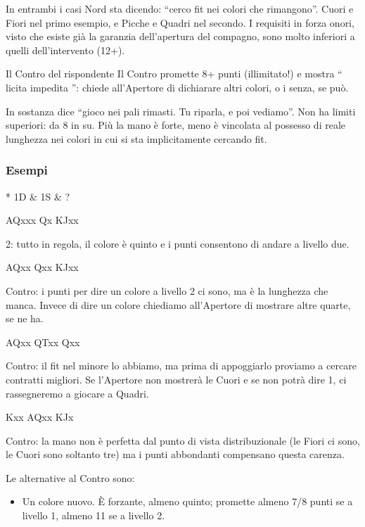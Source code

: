 \documentclass[../corsofiori.tex]{subfiles}
\begin{document}
In entrambi i casi Nord sta dicendo: “cerco fit nei colori che rimangono”.
Cuori e Fiori nel primo esempio, e Picche e Quadri nel secondo. I requisiti in forza
onori, visto che esiste già la garanzia dell’apertura del compagno, sono molto
inferiori a quelli dell’intervento (12+).

\begin{regola}{Il Contro del rispondente}
Il Contro promette 8+ punti (illimitato!)
e mostra “ licita impedita ”: chiede all’Apertore
di dichiarare altri colori, o i senza, se può.
\end{regola}

In sostanza dice “gioco nei pali rimasti. Tu riparla, e poi vediamo”. Non ha limiti
superiori: da 8 in su. Più la mano è forte, meno è vincolata al possesso di reale
lunghezza nei colori in cui si sta implicitamente cercando fit.

\subsubsection{Esempi}
\begin{bidding}*
    1D & 1S & ?\\
\end{bidding}

 {AQxxx}  {Qx}  {KJxx}

2\He: tutto in regola, il colore è quinto e i punti consentono di andare a livello due.
\smallskip

  {AQxx}  {Qxx}  {KJxx}

Contro: i punti per dire un colore a livello 2 ci sono, ma è la lunghezza che manca.  Invece di dire un colore chiediamo
all’Apertore di mostrare altre quarte, se ne ha.
\smallskip

  {AQxx}  {QTxx}  {Qxx}

Contro: il fit nel minore lo abbiamo, ma prima di appoggiarlo proviamo a cercare contratti migliori. Se l’Apertore non
mostrerà le Cuori e se non potrà dire 1\SA, ci
rassegneremo a giocare a Quadri.

  {Kxx}  {AQxx}  {KJx}

Contro: la mano non è perfetta dal punto di vista distribuzionale (le Fiori ci sono, le
Cuori sono soltanto tre) ma i punti abbondanti compensano questa carenza.

Le alternative al Contro sono:
\begin{itemize}
\item Un colore nuovo. \`E forzante, almeno quinto; promette almeno 7/8 punti se a livello
1, almeno 11 se a livello 2.
\end{itemize}
\end{document}
